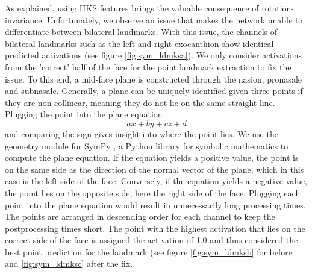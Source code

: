 \documentclass[class=article, crop=false]{standalone}
\begin{document}
As explained, using HKS features brings the valuable consequence of rotation-invariance. Unfortunately, we observe an issue that makes the network unable to differentiate between bilateral landmarks. With this issue, the channels of bilateral landmarks such as the left and right exocanthion show identical predicted activations (see figure \ref{fig:sym_ldmksa}). We only consider activations from the 'correct' half of the face for the point landmark extraction to fix the issue. To this end, a mid-face plane is constructed through the nasion, pronasale and subnasale. Generally, a plane can be uniquely identified given three points if they are non-collinear, meaning they do not lie on the same straight line. Plugging the point into the plane equation
\begin{equation}
    ax + by + cz + d 
\end{equation} 
and comparing the sign gives insight into where the point lies. We use the geometry module for SymPy \cite{10.7717/peerj-cs.103}, a Python library for symbolic mathematics to compute the plane equation. If the equation yields a positive value, the point is on the same side as the direction of the normal vector of the plane, which in this case is the left side of the face. Conversely, if the equation yields a negative value, the point lies on the opposite side, here the right side of the face. Plugging each point into the plane equation would result in unnecessarily long processing times. The points are arranged in descending order for each channel to keep the postprocessing times short. The point with the highest activation that lies on the correct side of the face is assigned the activation of 1.0 and thus considered the best point prediction for the landmark (see figure \ref{fig:sym_ldmksb} for before and \ref{fig:sym_ldmksc} after the fix.
\end{document}
